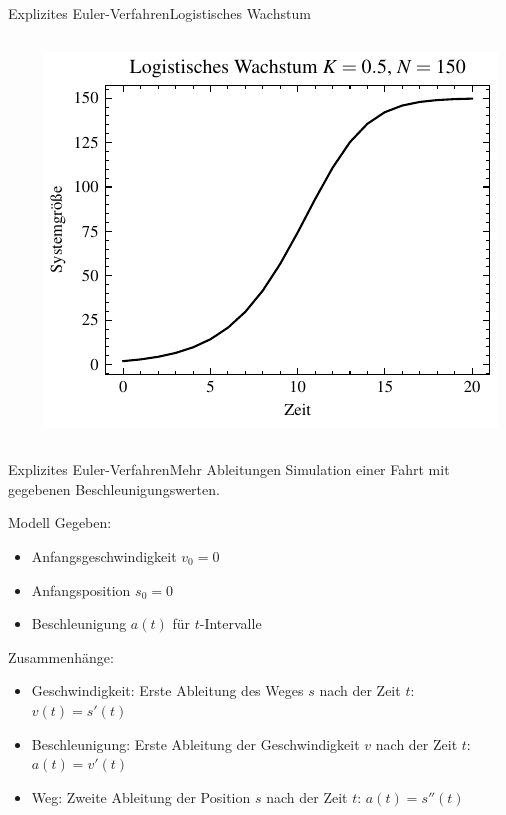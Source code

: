 \documentclass[xelatex,aspectratio=169]{beamer}
\begin{document}
\begin{frame}{Explizites Euler-Verfahren}{Logistisches Wachstum}
    \begin{columns}
        \begin{column}{0.5\textwidth}
            \inputminted[firstline=13,lastline=25]{python}{src/sim_growth_log.py}
        \end{column}
        \begin{column}{0.5\textwidth}
            \includegraphics[width=\textwidth]{fig/sim_growth_log.pdf}
        \end{column}
    \end{columns}
\end{frame}

\begin{frame}{Explizites Euler-Verfahren}{Mehr Ableitungen}
    Simulation einer Fahrt mit gegebenen Beschleunigungswerten.
    \begin{block}{Modell}
        Gegeben:
        \begin{itemize}
            \item Anfangsgeschwindigkeit $v_0 = 0$
            \item Anfangsposition $s_0 = 0$
            \item Beschleunigung $a(t)$ für $t$-Intervalle
        \end{itemize}
        Zusammenhänge:
        \begin{itemize}
            \item Geschwindigkeit: Erste Ableitung des Weges $s$ nach der Zeit $t$: $v(t) = s'(t)$
            \item Beschleunigung: Erste Ableitung der Geschwindigkeit $v$ nach der Zeit $t$: $a(t) = v'(t)$
            \item Weg: Zweite Ableitung der Position $s$ nach der Zeit $t$: $a(t) = s''(t)$
        \end{itemize}
    \end{block}
\end{frame}
\end{document}
